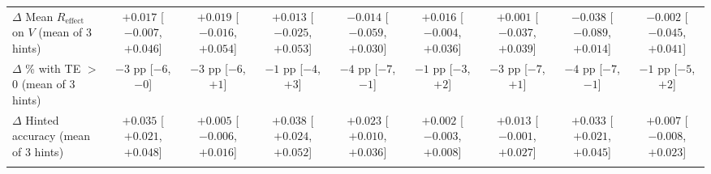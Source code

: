 \begin{table}[htbp]
{\begin{tabular}{lcccccccc}
\addlinespace
$\Delta$ Mean $R_{\mathrm{effect}}$ on $V$ (mean of 3 hints) & \makecell{$+0.017$ \\ \scriptsize[$-0.007$, $+0.046$]} & \makecell{$+0.019$ \\ \scriptsize[$-0.016$, $+0.054$]} & \makecell{$+0.013$ \\ \scriptsize[$-0.025$, $+0.053$]} & \makecell{$-0.014$ \\ \scriptsize[$-0.059$, $+0.030$]} & \makecell{$+0.016$ \\ \scriptsize[$-0.004$, $+0.036$]} & \makecell{$+0.001$ \\ \scriptsize[$-0.037$, $+0.039$]} & \makecell{$-0.038$ \\ \scriptsize[$-0.089$, $+0.014$]} & \makecell{$-0.002$ \\ \scriptsize[$-0.045$, $+0.041$]} \\
\addlinespace
$\Delta$ \% with TE $>$ 0 (mean of 3 hints) & \makecell{$-3$ pp \\ \scriptsize[$-6$, $-0$]} & \makecell{$-3$ pp \\ \scriptsize[$-6$, $+1$]} & \makecell{$-1$ pp \\ \scriptsize[$-4$, $+3$]} & \makecell{$-4$ pp \\ \scriptsize[$-7$, $-1$]} & \makecell{$-1$ pp \\ \scriptsize[$-3$, $+2$]} & \makecell{$-3$ pp \\ \scriptsize[$-7$, $+1$]} & \makecell{$-4$ pp \\ \scriptsize[$-7$, $-1$]} & \makecell{$-1$ pp \\ \scriptsize[$-5$, $+2$]} \\
\addlinespace
$\Delta$ Hinted accuracy (mean of 3 hints) & \makecell{$+0.035$ \\ \scriptsize[$+0.021$, $+0.048$]} & \makecell{$+0.005$ \\ \scriptsize[$-0.006$, $+0.016$]} & \makecell{$+0.038$ \\ \scriptsize[$+0.024$, $+0.052$]} & \makecell{$+0.023$ \\ \scriptsize[$+0.010$, $+0.036$]} & \makecell{$+0.002$ \\ \scriptsize[$-0.003$, $+0.008$]} & \makecell{$+0.013$ \\ \scriptsize[$-0.001$, $+0.027$]} & \makecell{$+0.033$ \\ \scriptsize[$+0.021$, $+0.045$]} & \makecell{$+0.007$ \\ \scriptsize[$-0.008$, $+0.023$]} \\
\addlinespace

\end{tabular}}
\end{table}
